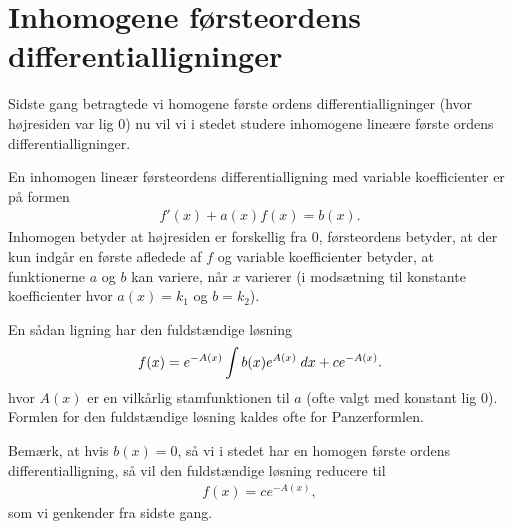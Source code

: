 \section{Inhomogene førsteordens differentialligninger}
\noindent Sidste gang betragtede vi homogene første ordens differentialligninger (hvor højresiden var lig $0$) nu vil vi i stedet studere inhomogene lineære første ordens differentialligninger.

En inhomogen lineær førsteordens differentialligning med variable koefficienter er på formen 
\begin{align*}
f'(x) + a(x)f(x)=b(x).
\end{align*}
Inhomogen betyder at højresiden er forskellig fra $0$, førsteordens betyder, at der kun indgår en første afledede af $f$ og variable koefficienter betyder, at funktionerne $a$ og $b$ kan variere, når $x$ varierer (i modsætning til konstante koefficienter hvor $a(x)=k_1$ og $b=k_2$).

En sådan ligning har den fuldstændige løsning 
\begin{align}\label{eq:diffeq4et}
f(x)=e^{-A(x)} \int b(x) e^{A(x)} \; d x + ce^{-A(x)}.
\end{align}
hvor $A(x)$ er en vilkårlig stamfunktionen til $a$ (ofte valgt med konstant lig $0$). Formlen for den fuldstændige løsning kaldes ofte for Panzerformlen.

Bemærk, at hvis $b(x)=0$, så vi i stedet har en homogen første ordens differentialligning, så vil den fuldstændige løsning reducere til 
\begin{align*}
f(x)=ce^{-A(x)},
\end{align*}
som vi genkender fra sidste gang.

